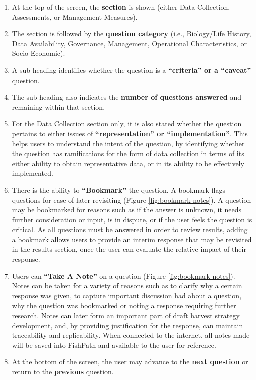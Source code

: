 \documentclass[
  11pt,
]{book}
\providecommand{\tightlist}{%
  \setlength{\itemsep}{0pt}\setlength{\parskip}{0pt}}
\begin{document}
\begin{enumerate}
\def\labelenumi{\arabic{enumi}.}
\tightlist
\item
  At the top of the screen, the \textbf{section} is shown (either Data Collection, Assessments, or Management Measures).
\item
  The section is followed by the \textbf{question category} (i.e., Biology/Life History, Data Availability, Governance, Management, Operational Characteristics, or Socio-Economic).
\item
  A sub-heading identifies whether the question is a \textbf{``criteria'' or a ``caveat''} question.
\item
  The sub-heading also indicates the \textbf{number of questions answered} and remaining within that section.
\item
  For the Data Collection section only, it is also stated whether the question pertains to either issues of \textbf{``representation'' or ``implementation''}. This helps users to understand the intent of the question, by identifying whether the question has ramifications for the form of data collection in terms of its either ability to obtain representative data, or in its ability to be effectively implemented.
\item
  There is the ability to \textbf{``Bookmark''} the question. A bookmark flags questions for ease of later revisiting (Figure \ref{fig:bookmark-notes}). A question may be bookmarked for reasons such as if the answer is unknown, it needs further consideration or input, is in dispute, or if the user feels the question is critical. As all questions must be answered in order to review results, adding a bookmark allows users to provide an interim response that may be revisited in the results section, once the user can evaluate the relative impact of their response.
\item
  Users can \textbf{``Take A Note''} on a question (Figure \ref{fig:bookmark-notes}). Notes can be taken for a variety of reasons such as to clarify why a certain response was given, to capture important discussion had about a question, why the question was bookmarked or noting a response requiring further research. Notes can later form an important part of draft harvest strategy development, and, by providing justification for the response, can maintain traceability and replicability. When connected to the internet, all notes made will be saved into FishPath and available to the user for reference.
\item
  At the bottom of the screen, the user may advance to the \textbf{next question} or return to the \textbf{previous} question.
\end{enumerate}
\end{document}
